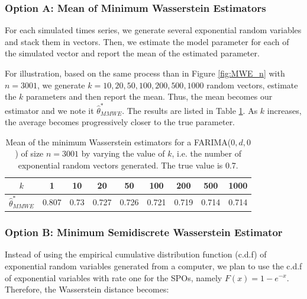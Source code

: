 \documentclass[
  11pt,
]{article}
\begin{document}
\hypertarget{option-a-mean-of-minimum-wasserstein-estimators}{%
\subsubsection{Option A: Mean of Minimum Wasserstein
Estimators}\label{option-a-mean-of-minimum-wasserstein-estimators}}

For each simulated times series, we generate several exponential random
variables and stack them in vectors. Then, we estimate the model
parameter for each of the simulated vector and report the mean of the
estimated parameter.

For illustration, based on the same process than in Figure
\ref{fig:MWE_n} with \(n = 3001\), we generate
\(k = 10, 20 , 50, 100 , 200, 500, 1000\) random vectors, estimate the
\(k\) parameters and then report the mean. Thus, the mean becomes our
estimator and we note it \(\hat \theta^*_{MMWE}\). The results are
listed in Table \ref{tab:MWE_k}. As \(k\) increases, the average becomes
progressively closer to the true parameter.

\begin{table}[h]
\centering
\begin{tabular}{|c|c|c|c|c|c|c|c|c|}
\hline
$k$ &  1 & 10   & 20    & 50    & 100   & 200   & 500   & 1000 \\
\hline
$\hat \theta^*_{MMWE}$ & 0.807 & 0.73 & 0.727 & 0.726 & 0.721 & 0.719 & 0.714 & 0.714 \\
\hline
\end{tabular}
\caption{Mean of the minimum Wasserstein estimators for a FARIMA($0,d,0$) of size $n = 3001$ by varying the value of $k$, i.e. the number of exponential random vectors generated. The true value is 0.7.}
\label{tab:MWE_k}
\end{table}

\hypertarget{option-b-minimum-semidiscrete-wasserstein-estimator}{%
\subsubsection{Option B: Minimum Semidiscrete Wasserstein
Estimator}\label{option-b-minimum-semidiscrete-wasserstein-estimator}}

Instead of using the empirical cumulative distribution function (c.d.f)
of exponential random variables generated from a computer, we plan to
use the c.d.f of exponential variables with rate one for the SPOs,
namely \(F(x)=1-e^{-x}\). Therefore, the Wasserstein distance becomes:
\end{document}

